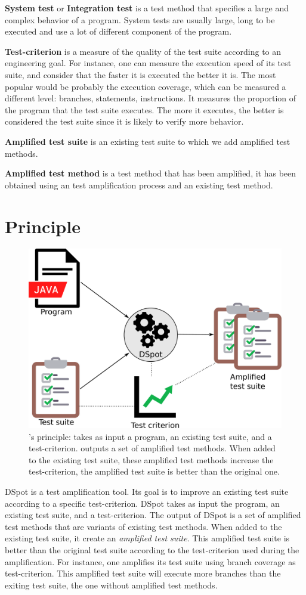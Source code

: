 \textbf{System test} or \textbf{Integration test} is a test method that specifies a large and complex behavior of a program.
System tests are usually large, long to be executed and use a lot of different component of the program.

\textbf{Test-criterion} is a measure of the quality of the test suite according to an engineering goal.
For instance, one can measure the execution speed of its test suite, and consider that the faster it is executed the better it is.
The most popular would be probably the execution coverage, which can be measured a different level: branches, statements, instructions.
It measures the proportion of the program that the test suite executes.
The more it executes, the better is considered the test suite since it is likely to verify more behavior.

\textbf{Amplified test suite} is an existing test suite to which we add amplified test methods.

\textbf{Amplified test method} is a test method that has been amplified, \ie it has been obtained using an test amplification process and an existing test method.

\section{Principle}
\label{sec:dspot:principle}

\begin{figure}[h]
	\centering
	\includegraphics[width=.6\linewidth]{dspot_principle.pdf}
	\caption{
		\dspot's principle: \dspot takes as input a program, an existing test suite, and a test-criterion. 
		\dspot outputs a set of amplified test methods.
		When added to the existing test suite, these amplified test methods increase the test-criterion, \ie the amplified test suite is better than the original one.
	}
	\label{fig:dspot:principle}
\end{figure}

DSpot is a test amplification tool.
Its goal is to improve an existing test suite according to a specific test-criterion.
DSpot takes as input the program, an existing test suite, and a test-criterion. 
The output of DSpot is a set of amplified test methods that are variants of existing test methods.
When added to the existing test suite, it create an \emph{amplified test suite}.
This amplified test suite is better than the original test suite according to the test-criterion used during the amplification.
For instance, one amplifies its test suite using branch coverage as test-criterion.
This amplified test suite will execute more branches than the exiting test suite, \ie the one without amplified test methods.

